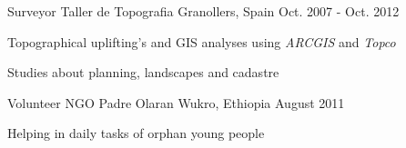
\begin{cventries}

  \cventry
    {Surveyor} %
    {Taller de Topografia} %
    {Granollers, Spain} %
    {Oct. 2007 - Oct. 2012} %
    {
      \begin{cvitems} %
        \item {Topographical uplifting’s and GIS analyses using \textit{ARCGIS} and \textit{Topco}}
        \item {Studies about planning, landscapes and cadastre}
      \end{cvitems}
    }    

  \cventry
    {Volunteer} %
    {NGO Padre Olaran} %
    {Wukro, Ethiopia} %
    {August 2011} %
    {
      \begin{cvitems} %
        \item {Helping in daily tasks of orphan young people}
      \end{cvitems}
    }
    

\end{cventries}
